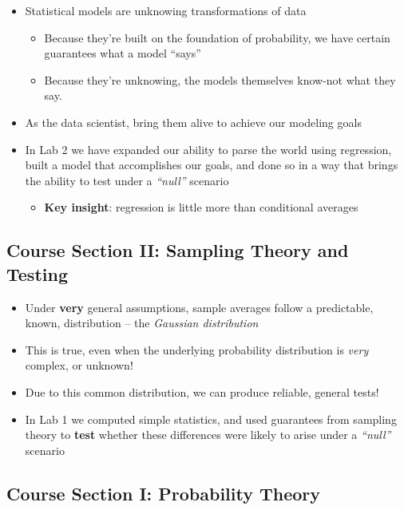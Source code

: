 \documentclass[
]{book}
\providecommand{\tightlist}{%
  \setlength{\itemsep}{0pt}\setlength{\parskip}{0pt}}
\theoremstyle{definition}
\theoremstyle{definition}
\theoremstyle{definition}
\theoremstyle{definition}
\theoremstyle{remark}
\begin{document}
\begin{itemize}
\item
  Statistical models are unknowing transformations of data

  \begin{itemize}
  \tightlist
  \item
    Because they're built on the foundation of probability, we have certain guarantees what a model ``says''
  \item
    Because they're unknowing, the models themselves know-not what they say.
  \end{itemize}
\item
  As the data scientist, bring them alive to achieve our modeling goals
\item
  In Lab 2 we have expanded our ability to parse the world using regression, built a model that accomplishes our goals, and done so in a way that brings the ability to test under a \emph{``null''} scenario

  \begin{itemize}
  \tightlist
  \item
    \textbf{Key insight}: regression is little more than conditional averages
  \end{itemize}
\end{itemize}

\hypertarget{course-section-ii-sampling-theory-and-testing}{%
\subsection{Course Section II: Sampling Theory and Testing}\label{course-section-ii-sampling-theory-and-testing}}

\begin{itemize}
\tightlist
\item
  Under \textbf{very} general assumptions, sample averages follow a predictable, known, distribution -- the \emph{Gaussian distribution}
\item
  This is true, even when the underlying probability distribution is \emph{very} complex, or unknown!
\item
  Due to this common distribution, we can produce reliable, general tests!
\item
  In Lab 1 we computed simple statistics, and used guarantees from sampling theory to \textbf{test} whether these differences were likely to arise under a \emph{``null''} scenario
\end{itemize}

\hypertarget{course-section-i-probability-theory}{%
\subsection{Course Section I: Probability Theory}\label{course-section-i-probability-theory}}
\end{document}
